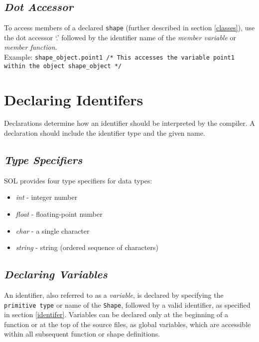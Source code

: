     \subsection{\textit{Dot Accessor}}
    To access members of a declared \texttt{shape} (further described in section \ref{classes}), use the dot accessor `.' followed by the identifier name of the \textit{member variable} or \textit{member function}. \\
    Example: \texttt{shape\_object.point1 /* This accesses the variable point1 within the object shape\_object */}


\section{Declaring Identifers}

    Declarations determine how an identifier should be interpreted by the compiler. A declaration should include the identifier type and the given name.

    \subsection{\textit{Type Specifiers}} \label{type}
    SOL provides four type specifiers for data types:
    \begin{itemize}
        \itemsep0em
        \item \textit{int} - integer number
        \item \textit{float} - floating-point number
        \item \textit{char} - a single character
        \item \textit{string} - string (ordered sequence of characters)
    \end{itemize}

    \subsection{\textit{Declaring Variables}}
    An identifier, also referred to as a \textit{variable}, is declared by specifying the \texttt{primitive type} or name of the \texttt{Shape}, followed by a valid identifier, as specified in section \ref{identifer}. Variables can be declared only at the beginning of a function or at the top of the source files, as global variables, which are accessible within all subsequent function or shape definitions.

